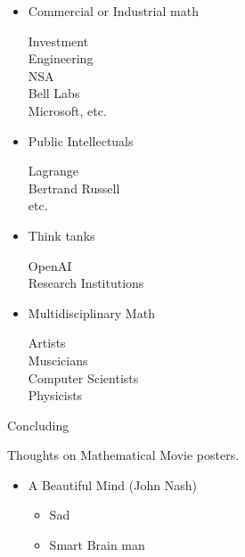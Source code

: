 \documentclass{report}
\begin{document}
\begin{description}
\begin{mdframed}
\begin{itemize}
\begin{mdframed}
                    \end{mdframed}
                \item Commercial or Industrial math 
                    \begin{mdframed}
                        Investment\\
                        Engineering\\
                        NSA\\
                        Bell Labs\\
                        Microsoft, etc.
                    \end{mdframed}
                \item Public Intellectuals
                    \begin{mdframed}
                        Lagrange\\
                        Bertrand Russell\\
                        etc. 
                    \end{mdframed}
                \item Think tanks
                    \begin{mdframed}
                        OpenAI\\
                        Research Institutions
                    \end{mdframed}
                \item Multidisciplinary Math
                    \begin{mdframed}
                        Artists\\ 
                        Muscicians\\
                        Computer Scientists\\
                        Physicists
                    \end{mdframed}
            \end{itemize}
        \end{mdframed}
    \item Concluding
        \begin{mdframed}
            Thoughts on Mathematical Movie posters.
            \begin{itemize}
                \item A Beautiful Mind (John Nash)
                    \begin{itemize}
                        \item Sad
                        \item Smart Brain man

\end{itemize}
\end{itemize}
\end{mdframed}
\end{description}
\end{document}
